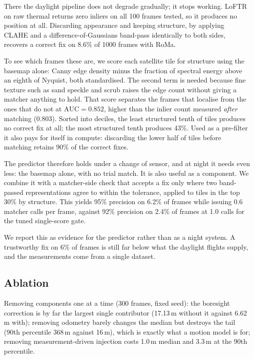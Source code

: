 \documentclass[conference]{IEEEtran}
\begin{document}
There the daylight pipeline does not degrade gradually; it stops working.
LoFTR on raw thermal returns zero inliers on all 100 frames tested, so it
produces no position at all. Discarding appearance and keeping structure, by
applying CLAHE and a
difference-of-Gaussians band-pass identically to both sides, recovers a
correct fix on 8.6\% of 1000 frames with RoMa.

To see which frames these are, we score each satellite tile for structure
using the basemap alone: Canny edge density minus the fraction of spectral
energy above an eighth of Nyquist, both standardised. The second term is
needed because fine texture such as sand speckle and scrub raises the edge
count without giving a matcher anything to hold. That score separates the frames
that localise from the ones that do not at $\mathrm{AUC}=0.852$, higher than
the inlier count measured \emph{after} matching (0.803). Sorted into deciles,
the least structured tenth of tiles produces no correct fix at all; the most
structured tenth produces 43\%. Used as a pre-filter it also pays for itself
in compute: discarding the lower half of tiles before matching retains 90\% of
the correct fixes.

The predictor therefore holds under a change of sensor, and at night it needs
even less: the basemap alone, with no trial match. It is also useful as a
component. We combine it with a matcher-side check that accepts a fix only
where two band-passed representations agree to within the tolerance, applied
to tiles in the top 30\% by structure. This yields 95\%
precision on 6.2\% of frames while issuing 0.6 matcher calls per frame, against
92\% precision on 2.4\% of frames at 1.0 calls for the tuned single-score gate.

We report this as evidence for the predictor rather than as a night system. A
trustworthy fix on 6\% of frames is still far below what the daylight flights
supply, and the measurements come from a single dataset.

\subsection{Ablation}
Removing components one at a time (300 frames, fixed seed): the boresight
correction is by far the largest single contributor (17.13\,m without it
against 6.62\,m with); removing odometry barely changes the median but
destroys the tail (90th percentile 368\,m against 16\,m), which is exactly
what a motion model is for; removing measurement-driven injection costs
1.0\,m median and 3.3\,m at the 90th percentile.
\end{document}
